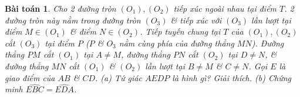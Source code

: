 \documentclass{article}
\newtheorem{baitoan}{Bài toán}
\begin{document}
\begin{baitoan}
	Cho 2 đường tròn $(O_1),(O_2)$ tiếp xúc ngoài nhau tại điểm $T$. 2 đường tròn này nằm trong đường tròn $(O_3)$ \& tiếp xúc với $(O_3)$ lần lượt tại điểm $M\in(O_1)$ \& điểm $N\in(O_2)$. Tiếp tuyến chung tại $T$ của $(O_1),(O_2)$ cắt $(O_3)$ tại điểm $P$ ($P$ \& $O_3$ nằm cùng phía của đường thẳng $MN$). Đường thẳng $PM$ cắt $(O_1)$ tại $A\ne M$, đường thẳng $PN$ cắt $(O_2)$ tại $D\ne N$, \& đường thẳng $MN$ cắt $(O_1)$ \& $(O_2)$ lần lượt tại $B\ne M$ \& $C\ne N$. Gọi $E$ là giao điểm của $AB$ \& $CD$. (a) Tứ giác $AEDP$ là hình gì? Giải thích. (b) Chứng minh $\widehat{EBC} = \widehat{EDA}$.
\end{baitoan}


\printbibliography[heading=bibintoc]
\end{document}
